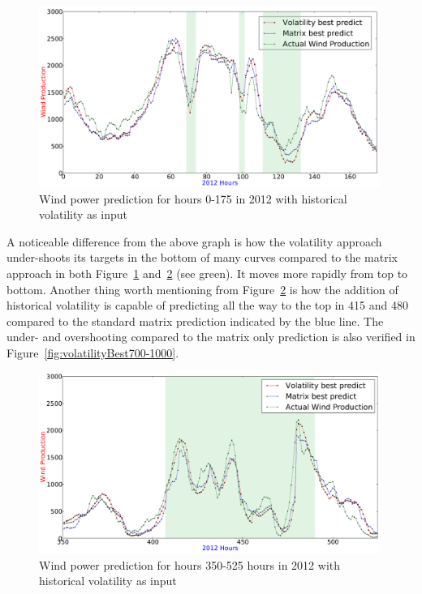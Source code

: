 \begin{figure}[ht!]
\centering
\includegraphics[width=0.99\textwidth]{billeder/bestVolatilityVsMatrixGraph.png}
\caption{Wind power prediction for hours 0-175 in 2012 with historical volatility as input}
\label{fig:bestVolatilityVsMatrixGraph}
\end{figure} 

A noticeable difference from the above graph is how the volatility approach under-shoots its targets in the bottom of many curves compared to the matrix approach in both Figure~\ref{fig:bestVolatilityVsMatrixGraph} and~\ref{fig:bestVolatilityVsMatrixGraph350-525} (see green). It moves more rapidly from top to bottom. Another thing worth mentioning from Figure~\ref{fig:bestVolatilityVsMatrixGraph350-525} is how the addition of historical volatility is capable of predicting all the way to the top in 415 and 480 compared to the standard matrix prediction indicated by the blue line. The under- and overshooting compared to the matrix only prediction is also verified in Figure~\ref{fig:volatilityBest700-1000}.

\begin{figure}[h!]
\centering
\includegraphics[width=0.99\textwidth]{billeder/bestVolatilityVsMatrixGraph350-525.png}
\caption{Wind power prediction for hours 350-525 hours in 2012 with historical volatility as input}
\label{fig:bestVolatilityVsMatrixGraph350-525}
\end{figure} 

